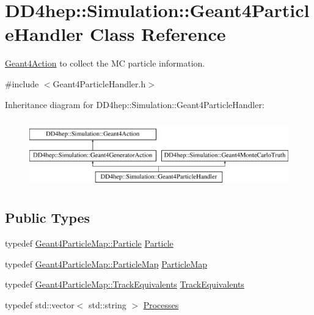 \hypertarget{class_d_d4hep_1_1_simulation_1_1_geant4_particle_handler}{}\section{D\+D4hep\+:\+:Simulation\+:\+:Geant4\+Particle\+Handler Class Reference}
\label{class_d_d4hep_1_1_simulation_1_1_geant4_particle_handler}


\hyperlink{class_d_d4hep_1_1_simulation_1_1_geant4_action}{Geant4\+Action} to collect the MC particle information.  




{\ttfamily \#include $<$Geant4\+Particle\+Handler.\+h$>$}

Inheritance diagram for D\+D4hep\+:\+:Simulation\+:\+:Geant4\+Particle\+Handler\+:\begin{figure}[H]
\begin{center}
\leavevmode
\includegraphics[height=3.000000cm]{class_d_d4hep_1_1_simulation_1_1_geant4_particle_handler}
\end{center}
\end{figure}
\subsection*{Public Types}
\begin{DoxyCompactItemize}
\item 
typedef \hyperlink{class_d_d4hep_1_1_simulation_1_1_geant4_particle_map_a01ed68f2fc2e55ecf936e5ac3e6eae5f}{Geant4\+Particle\+Map\+::\+Particle} \hyperlink{class_d_d4hep_1_1_simulation_1_1_geant4_particle_handler_a69214f487c50f6fd550571f37e715117}{Particle}
\item 
typedef \hyperlink{class_d_d4hep_1_1_simulation_1_1_geant4_particle_map_a065c5fb0629285022b9aa2a628bffef3}{Geant4\+Particle\+Map\+::\+Particle\+Map} \hyperlink{class_d_d4hep_1_1_simulation_1_1_geant4_particle_handler_a79cf5fe4ceb492dff4d3458306a08973}{Particle\+Map}
\item 
typedef \hyperlink{class_d_d4hep_1_1_simulation_1_1_geant4_particle_map_aba09f5fcb2dd5874d129660ad4454a21}{Geant4\+Particle\+Map\+::\+Track\+Equivalents} \hyperlink{class_d_d4hep_1_1_simulation_1_1_geant4_particle_handler_a6163ec58bca837bb4544fd6e2f4bc05a}{Track\+Equivalents}
\item 
typedef std\+::vector$<$ std\+::string $>$ \hyperlink{class_d_d4hep_1_1_simulation_1_1_geant4_particle_handler_a80c1482fd25ec687f429854033ac3f79}{Processes}
\end{DoxyCompactItemize}
